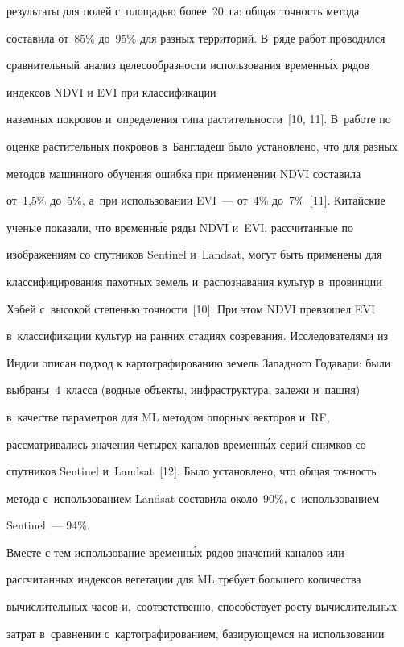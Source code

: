 результаты для полей с~площадью более~20~га: общая точ\-ность метода 

составила от~85\% до~95\% для разных территорий. В~ряде работ проводился 

сравнительный анализ целесообразности использования временн\'{ы}х рядов 

индексов NDVI и EVI при классификации 

наземных покровов и~определения типа растительности~[10, 11]. В~работе по 

оценке растительных покровов в~Бангладеш было установлено, что для разных 

методов машинного обучения ошибка при применении NDVI составила 

от~1,5\% до~5\%, а~при использовании EVI~--- от~4\% до~7\%~[11]. Китайские 

ученые показали, что временн\'{ы}е ряды NDVI и~EVI, рассчитанные по 

изображениям со спутников Sentinel и~Landsat, могут быть применены для 

классифицирования пахотных земель и~распознавания культур в~провинции 

Хэбей с~высокой степенью точ\-ности~[10]. При этом NDVI превзошел EVI 

в~классификации культур на ранних стадиях созревания. Исследователями из 

Индии описан подход к картографированию земель Западного Годавари: были 

выбраны~4~класса (водные объекты, инфраструктура, залежи и~пашня) 

в~качестве па\-ра\-мет\-ров для ML методом опорных векторов и~RF, 

рассматривались значения четырех каналов временн\'{ы}х серий снимков со 

спутников Sentinel и~Landsat~[12]. Было установлено, что общая точ\-ность 

метода с~использованием Landsat составила около~90\%, с~использованием 

Sentinel~--- 94\%.

  

  Вместе с тем использование временн\'{ы}х рядов значений каналов или 

рассчитанных индексов вегетации для ML требует большего количества 

вычислительных часов и,~соответственно, способствует росту вычислительных 

затрат в~сравнении с~картографированием, базирующемся на использовании 


